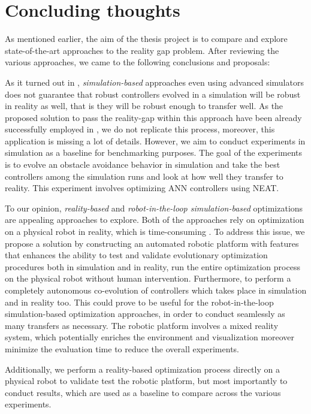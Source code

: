 \section{Concluding thoughts}

As mentioned earlier, the aim of the thesis project is to compare and explore state-of-the-art approaches to the reality gap problem. After reviewing the various approaches, we came to the following conclusions and proposals:

As it turned out in \citep{mouret201720}, \emph{simulation-based} approaches even using advanced simulators does not guarantee that robust controllers evolved in a simulation will be robust in reality as well, that is they will be robust enough to transfer well. As the proposed solution \citep{jakobi1995noise} to pass the reality-gap within this approach have been already successfully employed in \citep{jakobi1998running}, we do not replicate this process, moreover, this application is missing a lot of details. However, we aim to conduct experiments in simulation as a baseline for benchmarking purposes. The goal of the experiments is to evolve an obstacle avoidance behavior in simulation and take the best controllers among the simulation runs and look at how well they transfer to reality. This experiment involves optimizing ANN controllers using NEAT.

To our opinion, \emph{reality-based} and \emph{robot-in-the-loop simulation-based} optimizations are appealing approaches to explore. Both of the approaches rely on optimization on a physical robot in reality, which is time-consuming \citep{floreano1998evolutionary,koos2012transferability}. To address this issue, we propose a solution by constructing an automated robotic platform with features that enhances the ability to test and validate evolutionary optimization procedures both in simulation and in reality, run the entire optimization process on the physical robot without human intervention. Furthermore, to perform a completely autonomous co-evolution of controllers which takes place in simulation and in reality too. This could prove to be useful for the robot-in-the-loop simulation-based optimization approaches, in order to conduct seamlessly as many transfers as necessary. The robotic platform involves a mixed reality system, which potentially enriches the environment and visualization moreover minimize the evaluation time to reduce the overall experiments.

Additionally, we perform a reality-based optimization process directly on a physical robot to validate test the robotic platform, but most importantly to conduct results, which are used as a baseline to compare across the various experiments.


